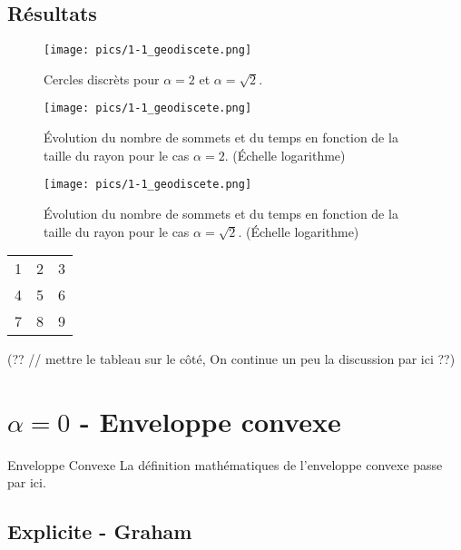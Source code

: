 \section{Résultats}
\label{pt3-ch1-sec:2}

\begin{figure}[h!]
\centering
   \texttt{[image: pics/1-1\_geodiscete.png]}
\caption{Cercles discrèts pour $\alpha = 2$ et $\alpha = \sqrt{2}$.}
\end{figure}


\begin{figure}[h!]
\centering
   \texttt{[image: pics/1-1\_geodiscete.png]}
\caption{Évolution du nombre de sommets et du temps en fonction de la taille du rayon pour le cas $\alpha = 2$. (Échelle logarithme)}
\end{figure}


\begin{figure}[h!]
\centering
   \texttt{[image: pics/1-1\_geodiscete.png]}
\caption{Évolution du nombre de sommets et du temps en fonction de la taille du rayon pour le cas $\alpha = \sqrt{2}$. (Échelle logarithme)}
\end{figure}


\begin{tabular}{| l || c | r | }
 \hline                 
   1 & 2 & 3 \\
   4 & 5 & 6 \\
   7 & 8 & 9 \\
 \hline  
 \end{tabular}
 
 
(?? // mettre le tableau sur le côté, On continue un peu la discussion par ici ??)

\chapter{$\alpha = 0$ - Enveloppe convexe}
\label{pt3-ch1--ch}

\begin{theorem}{Enveloppe Convexe}\newline
La définition mathématiques de l'enveloppe convexe passe par ici.
\end{theorem}

\section{Explicite - Graham}
\label{pt3-ch2-sec:1}

